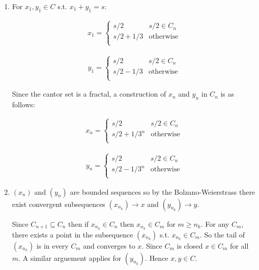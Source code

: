 \begin{enumerate}[label=(\alph*)]
    \item 
    For $x_1, y_1 \in C$ s.t. $x_1+y_1=s$:
    
    \begin{align*}
        x_1=\begin{cases}
            s/2 & s/2 \in C_n \\
            s/2+1/3 & \text{otherwise} \\
        \end{cases}
    \end{align*}

    \begin{align*}
        y_1=\begin{cases}
            s/2 & s/2 \in C_n \\
            s/2-1/3 & \text{otherwise} \\
        \end{cases}
    \end{align*}

    Since the cantor set is a fractal, a 
    construction of $x_n$ and $y_n$ in $C_n$
     is as  follows:

    \begin{align*}
        x_n=\begin{cases}
            s/2 & s/2 \in C_n \\
            s/2+1/3^n & \text{otherwise} \\
        \end{cases}
    \end{align*}

    \begin{align*}
        y_n=\begin{cases}
            s/2 & s/2 \in C_n \\
            s/2-1/3^n & \text{otherwise} \\
        \end{cases}
    \end{align*}

    \item
    $(x_n)$ and $(y_n)$ are bounded sequences so by the 
    Bolzano-Weierstrass \Thm there exist convergent 
    subsequences $(x_{n_k}) \rightarrow x$ and
     $(y_{n_k})\rightarrow y$. 

     Since $C_{n+1} \subseteq C_{n}$ then if $x_{n_k}\in C_n$ then 
     $x_{n_k} \in C_m$ for $m \geq n_k$. For any $C_m$, there exists a 
     point in the subsequence $(x_{n_k})$ s.t. $x_{n_k}\in C_m$. 
     So the tail of $(x_{n_k})$ is in every $C_m$ and converges to $x$.
     Since $C_m$ is closed $x \in C_m$ for all $m$. A similar arguement applies for
     $(y_{n_k})$. Hence $x,y\in C$.
\end{enumerate}

